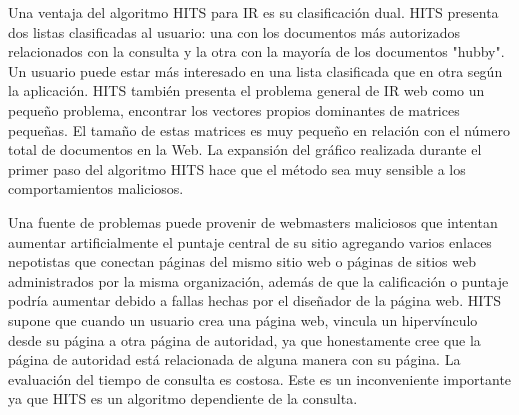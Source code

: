 \documentclass[11pt]{article}
\begin{document}
Una ventaja del algoritmo HITS para IR es su clasificación dual. HITS presenta dos listas clasificadas al usuario: una con los documentos más autorizados relacionados con la consulta y la otra con la mayoría de los documentos "hubby". Un usuario puede estar más interesado en una lista clasificada que en otra según la aplicación. HITS también presenta el problema general de IR web como un
pequeño problema, encontrar los vectores propios dominantes de matrices pequeñas. El tamaño de estas matrices es muy pequeño en relación con el número total de documentos en la Web.
La expansión del gráfico realizada durante el primer paso del algoritmo HITS hace que el método sea muy sensible a los comportamientos maliciosos.  \par \vspace{0.3cm}
Una fuente de problemas puede provenir de webmasters maliciosos que intentan aumentar artificialmente el puntaje central de su sitio agregando varios enlaces nepotistas que conectan páginas del mismo sitio web o páginas de sitios web administrados por la misma organización, además de que  la calificación o puntaje podría aumentar debido a fallas hechas por el diseñador de la página web. HITS supone que cuando un usuario crea una página web, vincula un hipervínculo desde su página a otra página de autoridad, ya que honestamente cree que la página de autoridad está relacionada de alguna manera con su página.
La evaluación del tiempo de consulta es costosa. Este es un inconveniente importante ya que HITS es un algoritmo dependiente de la consulta. 
\end{document}
